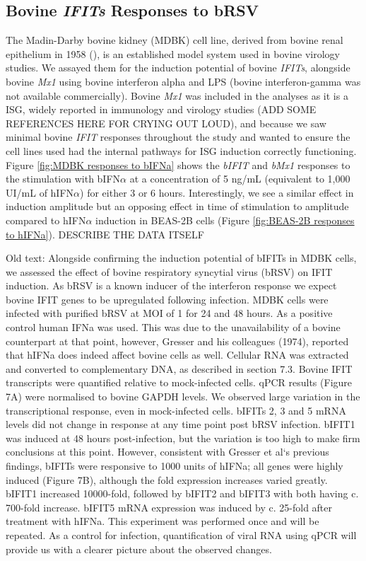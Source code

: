 \subsection{Bovine \textit{IFITs} Responses to bRSV} \label{subsec:Bovine IFITs Responses to bRSV}


The Madin-Darby bovine kidney (MDBK) cell line, derived from bovine renal epithelium in 1958 (\cite{Madin1958EstablishedOrigin}), is an established model system used in bovine virology studies. We assayed them for the induction potential of bovine \textit{IFITs}, alongside bovine \textit{Mx1} using bovine interferon alpha and LPS (bovine interferon-gamma was not available commercially). Bovine \textit{Mx1} was included in the analyses as it is a ISG, widely reported in immunology and virology studies (ADD SOME REFERENCES HERE FOR CRYING OUT LOUD), and because we saw minimal bovine \textit{IFIT} responses throughout the study and wanted to ensure the cell lines used had the internal pathways for ISG induction correctly functioning. Figure \ref{fig:MDBK responses to bIFNa} shows the \textit{bIFIT} and \textit{bMx1} responses to the stimulation with bIFN\(\alpha\) at a concentration of 5 ng/mL (equivalent to 1,000 UI/mL of hIFN\(\alpha\)) for either 3 or 6 hours. Interestingly, we see a similar effect in induction amplitude but an opposing effect in time of stimulation to amplitude compared to hIFN\(\alpha\) induction in BEAS-2B cells (Figure \ref{fig:BEAS-2B responses to hIFNa}). DESCRIBE THE DATA ITSELF

Old text:
Alongside confirming the induction potential of bIFITs in MDBK cells, we assessed the effect of bovine respiratory syncytial virus (bRSV) on IFIT induction. As bRSV is a known inducer of the interferon response we expect bovine IFIT genes to be upregulated following infection. MDBK cells were infected with purified bRSV at MOI of 1 for 24 and 48 hours. As a positive control human IFNa was used. This was due to the unavailability of a bovine counterpart at that point, however, Gresser and his colleagues (1974), reported that hIFNa does indeed affect bovine cells as well. Cellular RNA was extracted and converted to complementary DNA, as described in section 7.3. Bovine IFIT transcripts were quantified relative to mock-infected cells. qPCR results (Figure 7A) were normalised to bovine GAPDH levels. We observed large variation in the transcriptional response, even in mock-infected cells. bIFITs 2, 3 and 5 mRNA levels did not change in response at any time point post bRSV infection. bIFIT1 was induced at 48 hours post-infection, but the variation is too high to make firm conclusions at this point. However, consistent with Gresser et al`s previous findings, bIFITs were responsive to 1000 units of hIFNa; all genes were highly induced (Figure 7B), although the fold expression increases varied greatly. bIFIT1 increased 10000-fold, followed by bIFIT2 and bIFIT3 with both having c. 700-fold increase. bIFIT5 mRNA expression was induced by c. 25-fold after treatment with hIFNa. This experiment was performed once and will be repeated. As a control for infection, quantification of viral RNA using qPCR will provide us with a clearer picture about the observed changes.


